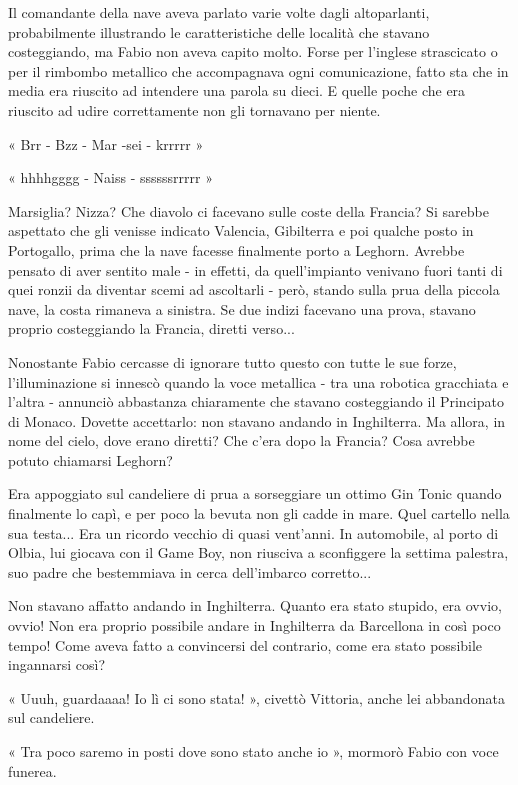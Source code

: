 Il comandante della nave aveva parlato varie volte dagli altoparlanti, probabilmente illustrando le caratteristiche delle località che stavano costeggiando, ma Fabio non aveva capito molto. Forse per l'inglese strascicato o per il rimbombo metallico che accompagnava ogni comunicazione, fatto sta che in media era riuscito ad intendere una parola su dieci. E quelle poche che era riuscito ad udire correttamente non gli tornavano per niente.

« Brr - Bzz - Mar -sei - krrrrr »

« hhhhgggg - Naiss - ssssssrrrrr »

Marsiglia? Nizza? Che diavolo ci facevano sulle coste della Francia? Si sarebbe aspettato che gli venisse indicato Valencia, Gibilterra e poi qualche posto in Portogallo, prima che la nave facesse finalmente porto a Leghorn. Avrebbe pensato di aver sentito male - in effetti, da quell'impianto venivano fuori tanti di quei ronzii da diventar scemi ad ascoltarli - però, stando sulla prua della piccola nave, la costa rimaneva a sinistra. Se due indizi facevano una prova, stavano proprio costeggiando la Francia, diretti verso...

Nonostante Fabio cercasse di ignorare tutto questo con tutte le sue forze, l'illuminazione si innescò quando la voce metallica - tra una robotica gracchiata e l'altra - annunciò abbastanza chiaramente che stavano costeggiando il Principato di Monaco. Dovette accettarlo: non stavano andando in Inghilterra. Ma allora, in nome del cielo, dove erano diretti? Che c'era dopo la Francia? Cosa avrebbe potuto chiamarsi Leghorn?

Era appoggiato sul candeliere di prua a sorseggiare un ottimo Gin Tonic quando finalmente lo capì, e per poco la bevuta non gli cadde in mare. Quel cartello nella sua testa... Era un ricordo vecchio di quasi vent'anni. In automobile, al porto di Olbia, lui giocava con il Game Boy, non riusciva a sconfiggere la settima palestra, suo padre che bestemmiava in cerca dell'imbarco corretto...

Non stavano affatto andando in Inghilterra. Quanto era stato stupido, era ovvio, ovvio! Non era proprio possibile andare in Inghilterra da Barcellona in così poco tempo! Come aveva fatto a convincersi del contrario, come era stato possibile ingannarsi così?

« Uuuh, guardaaaa! Io lì ci sono stata! », civettò Vittoria, anche lei abbandonata sul candeliere.

« Tra poco saremo in posti dove sono stato anche io », mormorò Fabio con voce funerea.

